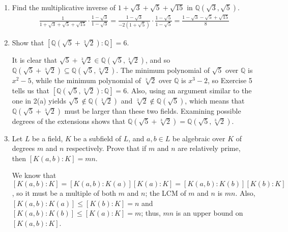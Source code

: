 \documentclass[12pt]{article}
\newcommand{\QQ}{\mathbb{Q}}
\begin{document}
\begin{enumerate}
    \item Find the multiplicative inverse of $1+\sqrt{3}+\sqrt{5}+\sqrt{15}$ in $\QQ(\sqrt{3},\sqrt{5})$.
        \begin{align*}
            \frac{1}{1 + \sqrt{3} + \sqrt{5} + \sqrt{15}} \cdot \frac{1 - \sqrt{3}}{1 - \sqrt{3}} = \frac{1 - \sqrt{3}}{-2(1 + \sqrt{5})} \cdot \frac{1 - \sqrt{5}}{1 - \sqrt{5}} = \frac{1 - \sqrt{3} - \sqrt{5} + \sqrt{15}}{8}
        \end{align*}

    \item Show that $[\QQ(\sqrt{5}+\sqrt[3]{2}) : \QQ] = 6$. \par
        It is clear that $\sqrt{5} + \sqrt[3]{2} \in \QQ(\sqrt{5}, \sqrt[3]{2})$, and so $\QQ(\sqrt{5} + \sqrt[3]{2}) \subseteq \QQ(\sqrt{5}, \sqrt[3]{2})$. The minimum polynomial of $\sqrt{5}$ over $\mathbb{Q}$ is $x^2 - 5$, while the minimum polynomial of $\sqrt[3]{2}$ over $\mathbb{Q}$ is $x^3 - 2$, so Exercise 5 tells us that $[\QQ(\sqrt{5}, \sqrt[3]{2}) : \QQ] = 6$. Also, using an argument similar to the one in 2(a) yields $\sqrt{5} \notin \mathbb{Q}(\sqrt[3]{2})$ and $\sqrt[3]{2} \notin \QQ(\sqrt{5})$, which means that $\QQ(\sqrt{5} + \sqrt[3]{2})$ must be larger than these two fields. Examining possible degrees of the extensions shows that $\QQ(\sqrt{5} + \sqrt[3]{2}) = \QQ(\sqrt{5}, \sqrt[3]{2})$.

    \item Let $L$ be a field, $K$ be a subfield of $L$, and $a,b \in L$ be algebraic over $K$ of degrees $m$ and $n$ respectively.  Prove that if $m$ and $n$ are relatively prime, then $[K(a,b):K] = mn$. \par
        We know that $[K(a, b) : K] = [K(a, b) : K(a)][K(a) : K] = [K(a, b) : K(b)][K(b) : K]$, so it must be a multiple of both $m$ and $n$; the LCM of $m$ and $n$ is $mn$. Also, $[K(a, b) : K(a)] \leq [K(b) : K] = n$ and $[K(a, b) : K(b)] \leq [K(a) : K] = m$; thus, $mn$ is an upper bound on $[K(a, b) : K]$.


\end{enumerate}
\end{document}
